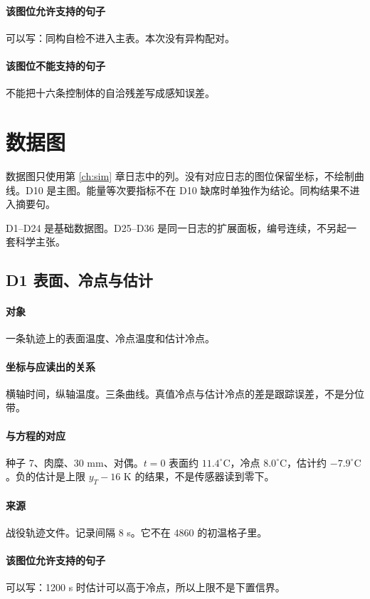 \paragraph{该图位允许支持的句子}
可以写：同构自检不进入主表。本次没有异构配对。

\paragraph{该图位不能支持的句子}
不能把十六条控制体的自洽残差写成感知误差。

\section{数据图}

数据图只使用第 \ref{ch:sim} 章日志中的列。没有对应日志的图位保留坐标，不绘制曲线。D10 是主图。能量等次要指标不在 D10 缺席时单独作为结论。同构结果不进入摘要句。

D1--D24 是基础数据图。D25--D36 是同一日志的扩展面板，编号连续，不另起一套科学主张。

\subsection{D1 表面、冷点与估计}
\paragraph{对象}
一条轨迹上的表面温度、冷点温度和估计冷点。

\paragraph{坐标与应读出的关系}
横轴时间，纵轴温度。三条曲线。真值冷点与估计冷点的差是跟踪误差，不是分位带。

\paragraph{与方程的对应}
种子 7、肉糜、30 mm、对偶。$t=0$ 表面约 $11.4^\circ\mathrm{C}$，冷点 $8.0^\circ\mathrm{C}$，估计约 $-7.9^\circ\mathrm{C}$。负的估计是上限 $y_T-16$ K 的结果，不是传感器读到零下。

\paragraph{来源}
战役轨迹文件。记录间隔 8 s。它不在 4860 的初温格子里。

\paragraph{该图位允许支持的句子}
可以写：1200 s 时估计可以高于冷点，所以上限不是下置信界。

